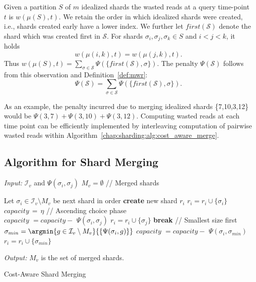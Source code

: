 Given a partition $S$ of $m$ idealized shards the wasted reads at a query time-point $t$ is $w(\mu(S), t)$. We retain the order in which idealized shards were created, i.e., shards created early have a lower index. We further let $first(\mathcal{S})$ denote the shard which was created first in $\mathcal{S}$. For shards $\sigma_i, \sigma_j, \sigma_k \in S$ and $i < j < k$, it holds 
$$w(\mu({i,k}),t) = w(\mu({j,k}),t).$$ Thus $w(\mu(S), t) = \sum_{\sigma \in \mathcal{S}}{\Psi(\{first(\mathcal{S}),\sigma\})}.$ The penalty $\Psi(\mathcal{S})$ follows from this observation and Definition~\ref{def:mwr}:
$$
\Psi(\mathcal{S}) = \sum_{\sigma \in \mathcal{S}}{\Psi(\{first(\mathcal{S}),\sigma\})}.
$$
 
As an example, the penalty incurred due to merging idealized shards \{7,10,3,12\} would be $\Psi(3,7) + \Psi(3,10) +
\Psi(3,12)$. Computing wasted reads at each time point can be efficiently implemented by interleaving computation of pairwise wasted reads within Algorithm~\ref{chap:sharding:alg:cost_aware_merge}.
 
\subsection{Algorithm for Shard Merging}

\begin{algorithm}[htb!]
   \begin{algorithmic}[1]
     \STATE  \emph{Input:} $\mathcal{I}_v$ and ${\Psi(\sigma_{i},\sigma_{j})}$ 
     \STATE $M_v = \emptyset$ \quad // Merged shards
 	
	\STATE {} 
			\STATE Let $\sigma_i \in \mathcal{I}_v \setminus  M_v$ be next shard in order
			\STATE \textbf{create} new shard $r_i$
			\STATE $r_i = r_i \cup \{\sigma_i\} $			
			\STATE $capacity \,=\, \eta$
			\STATE
			\STATE // Ascending choice phase \\
					\STATE $capacity \,\, = capacity - \,\, \Psi(\sigma_i,\sigma_j)$
					\STATE $r_i = r_i \cup \{\sigma_j\}$
				 \ELSE {}
					\STATE \textbf{break}
					\ENDIF
				\ENDIF
			\ENDFOR
			\STATE
			\STATE // Smallest size first
				    \STATE $\sigma_{min} = \argmin{g \in \mathcal{I}_v \setminus M_v}{\{\Psi(\sigma_i, g)\}}$
					\STATE $capacity \,\, =  capacity - \,\,\Psi(\sigma_i,\sigma_{min})$
					\STATE $r_i = r_i \cup \{\sigma_{min}\}$
			\ENDWHILE
			
		\ENDFOR
\STATE
\STATE\emph{Output:} $M_v$ is the set of merged shards.

   \end{algorithmic}
   \caption{Cost-Aware Shard Merging}
   \label{chap:sharding:alg:cost_aware_merge}
 \end{algorithm}


